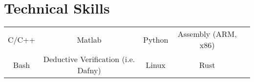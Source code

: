 \documentclass[letterpaper,12pt]{article}
\makeatletter
\newcommand{\simpleHeading}[2]{
    \vspace{-1pt}
    \begin{tabular*}{0.99\textwidth}[t]{l@{\extracolsep{\fill}}r}
        #1 & #2 \\
    \end{tabular*}
}
\newcommand{\positionHeading}[4]{
    \simpleHeading{\textbf{#1}}{\textit{#2}}
    \simpleHeading{\textit{#3}}{\textit{#4}}
}
\newcommand{\simpleParagraph}[1]{
    \vspace{-1pt}
    \begin{adjustwidth}{7pt}{0pt}
        #1
    \end{adjustwidth}
}
\newcommand{\matlab}[0]{
    Matlab
}
\makeatother
\begin{document}


    



\section{Technical Skills}
  \begin{adjustwidth}{0.15in}{0.0in}
    \begin{tabular*}{0.97\linewidth}{@{\extracolsep{\fill}} ccccc }
        C/C++
            & \matlab
            & Python
            & Assembly (ARM, x86)
            \vspace{4pt} 
            \\
       
        Bash
            & Deductive Verification (i.e. Dafny)
            & Linux
            & Rust
    \end{tabular*}
  \end{adjustwidth}


%




\end{document}
